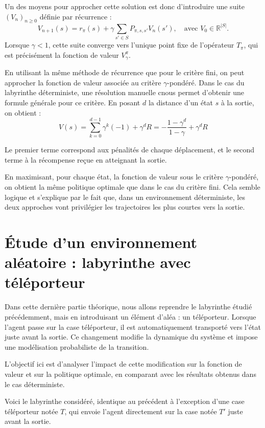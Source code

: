 \documentclass[12pt]{article}
\begin{document}
Un des moyens pour approcher cette solution est donc d'introduire une suite $(V_n)_{n \geq 0}$ définie par récurrence :
\[
V_{n+1}(s) = r_\pi(s) + \gamma \sum_{s' \in S} P_{\pi, s, s'} V_n(s'), \quad \text{avec } V_0 \in \mathbb{R}^{|S|}.
\]
Lorsque $\gamma < 1$, cette suite converge vers l’unique point fixe de l’opérateur $T_\pi$, qui est précisément la fonction de valeur $V^\pi_\gamma$.


En utilisant la même méthode de récurrence que pour le critère fini, on peut approcher la fonction de valeur associée au critère $\gamma$-pondéré. Dans le cas du labyrinthe déterministe, une résolution manuelle cnous permet d'obtenir une formule générale pour ce critère. En posant \(d\) la distance d’un état \(s\) à la sortie, on obtient :
\[
V(s) = \sum_{k=0}^{d-1} \gamma^k (-1) + \gamma^d R = -\frac{1 - \gamma^d}{1 - \gamma} + \gamma^d R
\]

Le premier terme correspond aux pénalités de chaque déplacement, et le second terme à la récompense reçue en atteignant la sortie.

En maximisant, pour chaque état, la fonction de valeur  sous le critère $\gamma$-pondéré, on obtient la même politique optimale que dans le cas du critère fini. Cela semble logique et  s’explique par le fait que, dans un environnement déterministe, les deux approches vont privilégier les trajectoires les plus courtes vers la sortie.

\section{Étude d’un environnement aléatoire : labyrinthe avec téléporteur}

Dans cette dernière partie théorique, nous allons reprendre le labyrinthe étudié précédemment, mais en introduisant un élément d’aléa : un téléporteur. Lorsque l’agent passe sur la case téléporteur, il est automatiquement transporté vers l’état juste avant la sortie. Ce changement modifie la dynamique du système et impose une modélisation probabiliste de la transition.

L’objectif ici est d’analyser l’impact de cette modification sur la fonction de valeur et sur la politique optimale, en comparant avec les résultats obtenus dans le cas déterministe.

Voici le labyrinthe considéré, identique au précédent à l’exception d’une case téléporteur notée \(T\), qui envoie l’agent directement sur la case notée \(T'\) juste avant la sortie.
\end{document}

